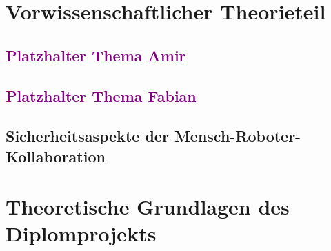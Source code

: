 \documentclass[titlepage,12pt,twoside]{article}
\begin{document}
\section{Vorwissenschaftlicher Theorieteil}

\subsection{\textcolor{purple}{Platzhalter Thema Amir}}
\subsection{\textcolor{purple}{Platzhalter Thema Fabian}}
\subsection{Sicherheitsaspekte der Mensch-Roboter-Kollaboration}

\section{Theoretische Grundlagen des Diplomprojekts}
\end{document}

